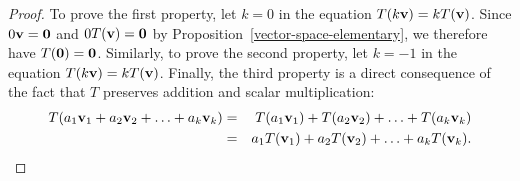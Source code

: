 \begin{proof}
  To prove the first property, let $k=0$ in the equation
  $T(k\mbox{\bf v}) = kT(\mbox{\bf v})$. Since $0\mbox{\bf v}=\mbox{\bf 0}$ and
  $0T(\mbox{\bf v})=\mbox{\bf 0}$ by
  Proposition~\ref{vector-space-elementary}, we therefore have
  $T(\mbox{\bf 0}) = \mbox{\bf 0}$.  Similarly, to prove the second property,
  let $k=-1$ in the equation $T(k\mbox{\bf v}) = kT(\mbox{\bf v})$.
  Finally, the third property is a direct consequence of the fact that
  $T$ preserves addition and scalar multiplication:
  \begin{eqnarray*}
    T(a_1\mbox{\bf v}_1 + a_2\mbox{\bf v}_2 + \ldots + a_k\mbox{\bf v}_k)
    &=& T(a_1\mbox{\bf v}_1) + T(a_2\mbox{\bf v}_2) + \ldots + T(a_k\mbox{\bf v}_k) \\
    &=& a_1T(\mbox{\bf v}_1) + a_2T(\mbox{\bf v}_2) + \ldots + a_kT(\mbox{\bf v}_k).
  \end{eqnarray*}
\end{proof}
